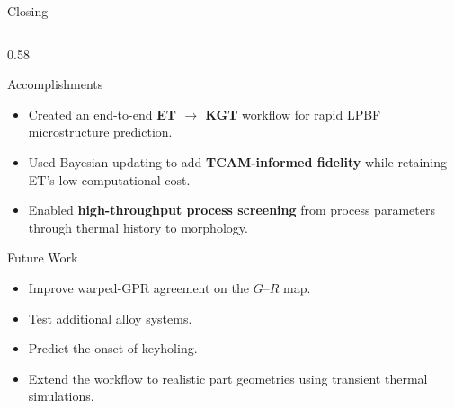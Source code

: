 \documentclass[aspectratio=169,11pt]{beamer}
\begin{document}
\begin{frame}[t]{Closing}
  \vspace{0.20cm}

  \begin{columns}[T,onlytextwidth]
    \begin{column}{0.58\textwidth}
      \begin{minipage}[t][0.81\textheight][t]{\linewidth}
      \vspace{0.62cm}
      \begin{block}{Accomplishments}
        \begin{itemize}
          \setlength{\itemsep}{0.62em}
          \item Created an end-to-end \textbf{ET $\rightarrow$ KGT} workflow for rapid LPBF microstructure prediction.
          \item Used Bayesian updating to add \textbf{TCAM-informed fidelity} while retaining ET's low computational cost.
          \item Enabled \textbf{high-throughput process screening} from process parameters through thermal history to morphology.
        \end{itemize}
      \end{block}

      \vspace{0.42em}
      \begin{alertblock}{Future Work}
        \begin{itemize}
          \setlength{\itemsep}{0.52em}
          \item Improve warped-GPR agreement on the $G$--$R$ map.
          \item Test additional alloy systems.
          \item Predict the onset of keyholing.
          \item Extend the workflow to realistic part geometries using transient thermal simulations.
        \end{itemize}
      \end{alertblock}

      \vfill
      {\centering
      \par}
      \vspace{0.08cm}
      \end{minipage}
    \end{column}


\end{columns}
\end{frame}
\end{document}
